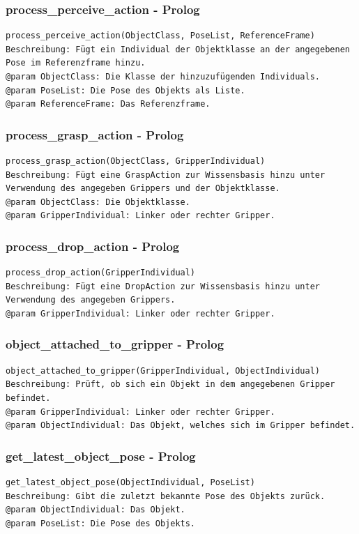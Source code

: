 \documentclass{suturo}
\begin{document}
\subsubsection{process\_perceive\_action - Prolog}
\begin{verbatim}
process_perceive_action(ObjectClass, PoseList, ReferenceFrame)
Beschreibung: Fügt ein Individual der Objektklasse an der angegebenen 
Pose im Referenzframe hinzu.
@param ObjectClass: Die Klasse der hinzuzufügenden Individuals.
@param PoseList: Die Pose des Objekts als Liste.
@param ReferenceFrame: Das Referenzframe.
\end{verbatim}

\subsubsection{process\_grasp\_action - Prolog}
\begin{verbatim}
process_grasp_action(ObjectClass, GripperIndividual)
Beschreibung: Fügt eine GraspAction zur Wissensbasis hinzu unter 
Verwendung des angegeben Grippers und der Objektklasse.
@param ObjectClass: Die Objektklasse.
@param GripperIndividual: Linker oder rechter Gripper.
\end{verbatim}

\subsubsection{process\_drop\_action - Prolog}
\begin{verbatim}
process_drop_action(GripperIndividual)
Beschreibung: Fügt eine DropAction zur Wissensbasis hinzu unter 
Verwendung des angegeben Grippers.
@param GripperIndividual: Linker oder rechter Gripper.
\end{verbatim}

\subsubsection{object\_attached\_to\_gripper - Prolog}
\begin{verbatim}
object_attached_to_gripper(GripperIndividual, ObjectIndividual)
Beschreibung: Prüft, ob sich ein Objekt in dem angegebenen Gripper befindet.
@param GripperIndividual: Linker oder rechter Gripper.
@param ObjectIndividual: Das Objekt, welches sich im Gripper befindet.
\end{verbatim}

\subsubsection{get\_latest\_object\_pose - Prolog}
\begin{verbatim}
get_latest_object_pose(ObjectIndividual, PoseList)
Beschreibung: Gibt die zuletzt bekannte Pose des Objekts zurück.
@param ObjectIndividual: Das Objekt.
@param PoseList: Die Pose des Objekts.
\end{verbatim}
\end{document}
